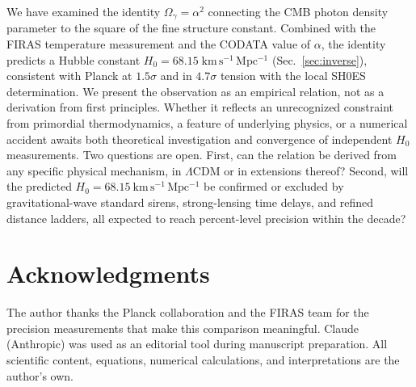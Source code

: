 \documentclass[12pt, a4paper]{article}
\begin{document}
We have examined the identity $\Omega_\gamma = \alpha^2$ connecting the CMB photon density parameter to the square of the fine structure constant. Combined with the FIRAS temperature measurement and the CODATA value of $\alpha$, the identity predicts a Hubble constant $H_0 = 68.15\;\mathrm{km\,s^{-1}\,Mpc^{-1}}$ (Sec.~\ref{sec:inverse}), consistent with Planck at $1.5\sigma$ and in $4.7\sigma$ tension with the local SH0ES determination. We present the observation as an empirical relation, not as a derivation from first principles. Whether it reflects an unrecognized constraint from primordial thermodynamics, a feature of underlying physics, or a numerical accident awaits both theoretical investigation and convergence of independent $H_0$ measurements. Two questions are open. First, can the relation be derived from any specific physical mechanism, in $\Lambda$CDM or in extensions thereof? Second, will the predicted $H_0 = 68.15~\mathrm{km\,s^{-1}\,Mpc^{-1}}$ be confirmed or excluded by gravitational-wave standard sirens, strong-lensing time delays, and refined distance ladders, all expected to reach percent-level precision within the decade?

\section*{Acknowledgments}
The author thanks the Planck collaboration and the FIRAS team for the precision measurements that make this comparison meaningful. Claude (Anthropic) was used as an editorial tool during manuscript preparation. All scientific content, equations, numerical calculations, and interpretations are the author's own.
\end{document}
